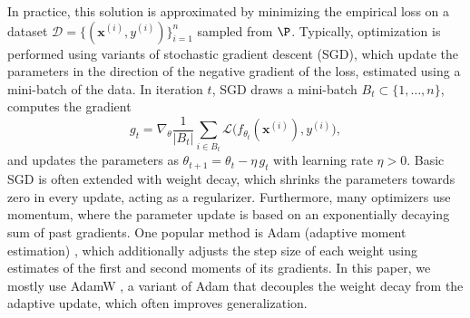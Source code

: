 \documentclass[article,shortnames]{jss}
\theoremstyle{definition}
\begin{document}
In practice, this solution is approximated by minimizing the empirical loss on a dataset $\mathcal{D} = \{ (\mathbf{x}^{(i)}, y^{(i)}) \}_{i=1}^n$ sampled from $\P$.
Typically, optimization is performed using variants of stochastic gradient descent (SGD), which update the parameters in the direction of the negative gradient of the loss, estimated using a mini-batch of the data.
In iteration $t$, SGD draws a mini-batch $B_t \subset \{1, \ldots, n\}$, computes the gradient
\begin{equation}
g_t = \nabla_\theta \frac{1}{|B_t|} \sum_{i \in B_t} \mathcal{L}\bigl(f_{\theta_t}(\mathbf{x}^{(i)}), y^{(i)}\bigr), \label{eq:gradient}
\end{equation}
and updates the parameters as $\theta_{t+1} = \theta_t - \eta \, g_t$ with learning rate $\eta > 0$.
Basic SGD is often extended with weight decay, which shrinks the parameters towards zero in every update, acting as a regularizer.
Furthermore, many optimizers use momentum, where the parameter update is based on an exponentially decaying sum of past gradients.
One popular method is Adam (adaptive moment estimation) \citep{ref-kingma2015adam}, which additionally adjusts the step size of each weight using estimates of the first and second moments of its gradients.
In this paper, we mostly use AdamW \citep{ref-loshchilov2017decoupled}, a variant of Adam that decouples the weight decay from the adaptive update, which often improves generalization.
\end{document}
